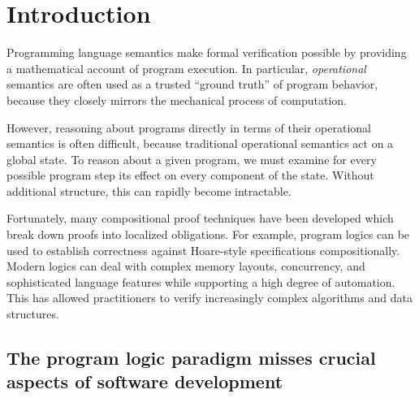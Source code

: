\documentclass[acmsmall,nonacm]{acmart}
\begin{document}
\section{Introduction} \label{ref:intro} %


Programming language semantics
make formal verification possible
by providing a mathematical account of program execution.
In particular,
\emph{operational} semantics
are often used as a trusted ``ground truth''
of program behavior,
because they closely mirrors
the mechanical process of computation.

However,
reasoning about programs
directly in terms of their operational semantics
is often difficult, because
traditional operational semantics act on a global state.
To reason about a given program,
we must examine for every possible program step
its effect on every component of the state.
Without additional structure,
this can rapidly become intractable.

Fortunately,
many
compositional proof techniques have been developed
which break down proofs into
localized obligations.
For example,
program logics
can be used to establish
correctness against Hoare-style specifications
compositionally.
%
Modern %
logics can deal with
complex memory layouts,
concurrency,
and sophisticated language features
while supporting
a high degree of automation.
This has allowed practitioners
to verify %
increasingly complex algorithms and data structures.



\subsection{The program logic paradigm %
  misses crucial aspects of software development}
\end{document}
